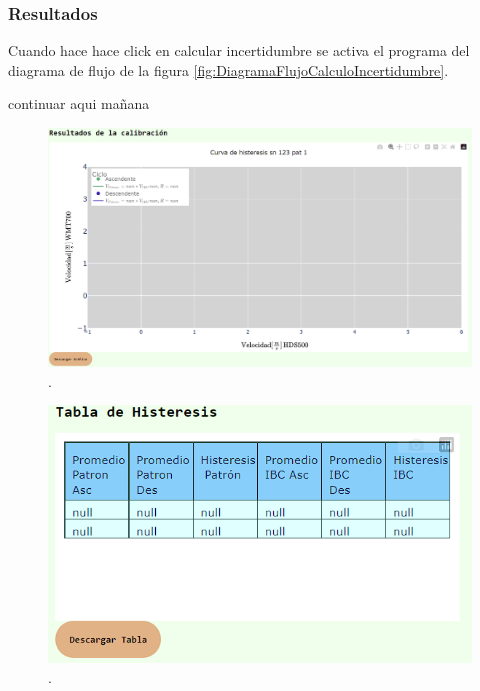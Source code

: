 \subsubsection{Resultados}\label{sec:Resultados}
Cuando hace hace click en calcular incertidumbre se activa el programa del diagrama de flujo de la figura \ref{fig:DiagramaFlujoCalculoIncertidumbre}.

continuar aqui mañana
\begin{figure}[H]
    \centering
    \includegraphics[width=1\linewidth]{Figuras/AplicacionWeb/frondend/curvaHisteris.png}
    \caption{.}
    \label{fig:curvaHisteris}
\end{figure}


\begin{figure}[H]
    \centering
    \includegraphics[width=0.6\linewidth]{Figuras/AplicacionWeb/frondend/tablaHisteresis.png}
    \caption{.}
    \label{fig:tablaHisteresis}
\end{figure}



